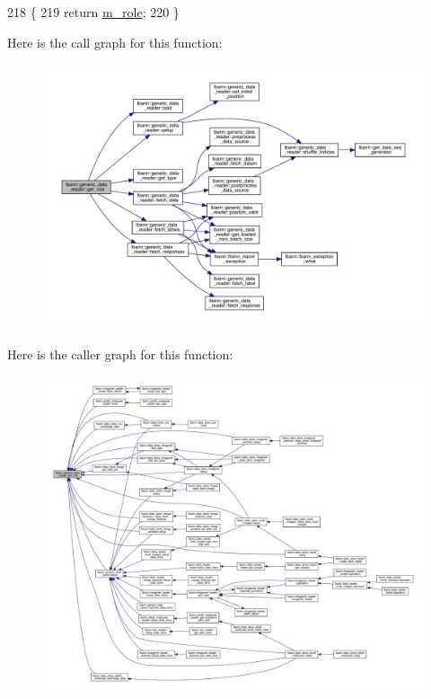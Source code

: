 \begin{DoxyCode}
218                              \{
219     \textcolor{keywordflow}{return} \hyperlink{classlbann_1_1generic__data__reader_a2f311e8c91be2a7ac93f6f141bb714a1}{m\_role};
220   \}
\end{DoxyCode}
Here is the call graph for this function\+:\nopagebreak
\begin{figure}[H]
\begin{center}
\leavevmode
\includegraphics[width=350pt]{classlbann_1_1generic__data__reader_a92982e1b399f37e2ead5aa440883cba5_cgraph}
\end{center}
\end{figure}
Here is the caller graph for this function\+:\nopagebreak
\begin{figure}[H]
\begin{center}
\leavevmode
\includegraphics[width=350pt]{classlbann_1_1generic__data__reader_a92982e1b399f37e2ead5aa440883cba5_icgraph}
\end{center}
\end{figure}
\mbox{\label{classlbann_1_1generic__data__reader_a48990d714a247463b135784f235f8a50}} 
